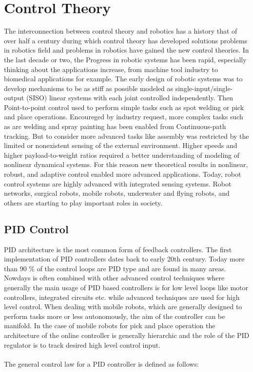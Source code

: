 
\chapter{Control Theory}
\label{chapter3}

The interconnection between control theory and robotics has a history that of over half a century during which control theory has developed solutions problems in robotics field and problems in robotics have gained the new control theories. In the last decade or two, the Progress in robotic systems has been rapid, especially thinking about the applications increase, from machine tool industry to biomedical applications for example. The early design of robotic systems was to develop mechanisms to be as stiff as possible modeled as single-input/single-output (SISO) linear systems with each joint controlled independently. Then Point-to-point control used to perform simple tasks such as spot welding or pick and place operations. Encoureged by industry request, more complex tasks such as arc welding and spray painting has been enabled from Continuous-path tracking. But to consider more advanced tasks like assembly was restricted by the limited or nonexistent sensing of the external environment. Higher speeds and higher payload-to-weight ratios required a better understanding of modeling of nonlinear dynamical systems. For this reason new theoretical results in nonlinear, robust, and adaptive control enabled more advanced applications. Today, robot control systems are highly advanced with integrated sensing systems. Robot networks, surgical robots, mobile robots, underwater and flying robots, and others are starting to play important roles in society.
\section{PID Control}

PID architecture is the most common form of feedback controllers. The first implementation of PID controllers dates back to early 20th century. Today more than 90 \% of the control loops are PID type and are found in many areas. Nowdays is often combined with other advanced control techniques where generally the main usage of PID based controllers is for low level loops like motor controllers, integrated circuits etc. while advanced techniques are used for high level control.
When dealing with mobile robots, which are generally designed to perform tasks more or less autonomously, the aim of the controller can be manifold. In the case of mobile robots for pick and place operation the architecture of the online controller is generally hierarchic and the role of the PID regulator is to track desired high level control input.
\\ 
\\ The general control law for a PID controller is defined as follows: 

